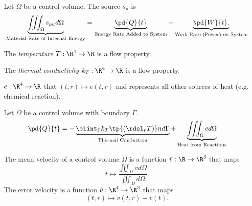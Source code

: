 \begin{ax}
Let $\Omega$ be a control volume.  The source $s_u$ is
\begin{equation}
    \underbrace{\iiint_\Omega s_{\rho u} d\Omega}_{\text{Material Rate of Internal Energy}}
    = \underbrace{\pd{Q}{t}}_{\text{Energy Rate Added to System}}
    + \underbrace{\pd{W}{t}.}_{\text{Work Rate (Power) on System}}
\end{equation}
\end{ax}

\begin{df}[Temperature]
    The \emph{temperature} $T:\R^4\to \R$ is a flow property.
\end{df}

\begin{df}
    The \emph{thermal conductivity} $k_T:\R^4\to \R$ is a flow property.
\end{df}

\begin{df}
    $e:\R^4\to \R$ that $(t,r)\mapsto e(t,r)$ and represents all other
    sources of heat (e.g. chemical reaction).
\end{df}

\begin{ax}
Let $\Omega$ be a control volume with boundary $\Gamma$.
    \begin{equation}
        \pd{Q}{t} =
        -\underbrace{\oiint_\Gamma k_T \tp{\left( \rdel_r T\right)} n d\Gamma}_{\text{Thermal Conduction}} +
        \underbrace{\iiint_\Omega e d\Omega}_{\text{Heat from Reactions}}
    \end{equation}
\end{ax}

\begin{df}
    The mean velocity of a control volume $\Omega$ is a function $\bar{v}:\R\to \R^3$ that maps
    \begin{equation}
        t \mapsto \frac{\iiint_\Omega v d\Omega}{\iiint_\Omega d\Omega}.
    \end{equation}
    The error velocity is a function $\tilde{v}:\R^4 \to \R^3$ that maps
    \begin{equation}
        (t,r) \mapsto v(t,r)-\bar{v}(t).
    \end{equation}
\end{df}

